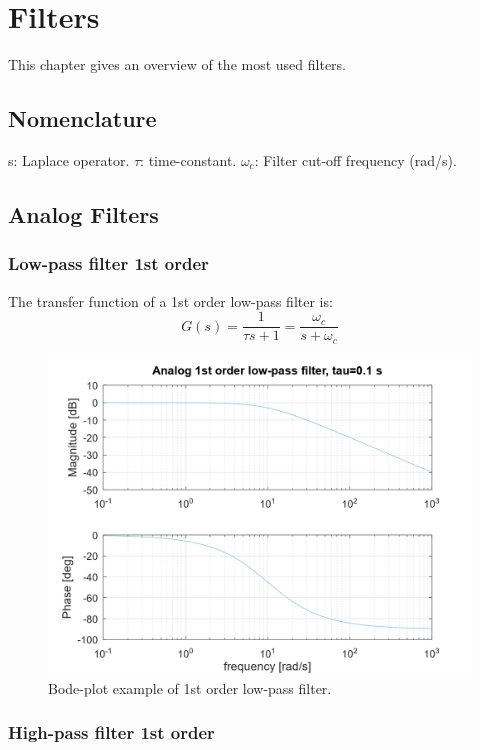 \documentclass[]{book}
\begin{document}
\hypertarget{filters}{%
\chapter{Filters}\label{filters}}

This chapter gives an overview of the most used filters.

\hypertarget{nomenclature}{%
\section{Nomenclature}\label{nomenclature}}

s: Laplace operator.
\(\tau\): time-constant.
\(\omega_c\): Filter cut-off frequency (rad/s).

\hypertarget{analog-filters}{%
\section{Analog Filters}\label{analog-filters}}

\hypertarget{low-pass-filter-1st-order}{%
\subsection{Low-pass filter 1st order}\label{low-pass-filter-1st-order}}

The transfer function of a 1st order low-pass filter is:
\[
G(s) =  \frac{1}{\tau s + 1} = \frac{\omega_c}{s + \omega_c}
\label{eq:lpf1}
\]

\begin{figure}
\includegraphics[width=0.8\linewidth]{images/filters/lpf_1st} \caption{Bode-plot example of 1st order low-pass filter.}\label{fig:unnamed-chunk-1}
\end{figure}

\hypertarget{high-pass-filter-1st-order}{%
\subsection{High-pass filter 1st order}\label{high-pass-filter-1st-order}}
\end{document}
